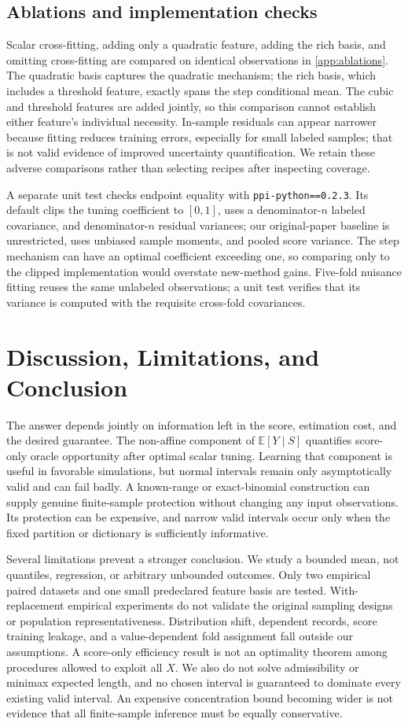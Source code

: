 \documentclass{article}
\newcommand{\E}{\mathbb{E}}
\begin{document}
\subsection{Ablations and implementation checks}
Scalar cross-fitting, adding only a quadratic feature, adding the rich basis, and omitting cross-fitting are compared on identical observations in \cref{app:ablations}. The quadratic basis captures the quadratic mechanism; the rich basis, which includes a threshold feature, exactly spans the step conditional mean. The cubic and threshold features are added jointly, so this comparison cannot establish either feature's individual necessity. In-sample residuals can appear narrower because fitting reduces training errors, especially for small labeled samples; that is not valid evidence of improved uncertainty quantification. We retain these adverse comparisons rather than selecting recipes after inspecting coverage.

A separate unit test checks endpoint equality with \texttt{ppi-python==0.2.3}. Its default clips the tuning coefficient to $[0,1]$, uses a denominator-$n$ labeled covariance, and denominator-$n$ residual variances; our original-paper baseline is unrestricted, uses unbiased sample moments, and pooled score variance. The step mechanism can have an optimal coefficient exceeding one, so comparing only to the clipped implementation would overstate new-method gains. Five-fold nuisance fitting reuses the same unlabeled observations; a unit test verifies that its variance is computed with the requisite cross-fold covariances.

\section{Discussion, Limitations, and Conclusion}
The answer depends jointly on information left in the score, estimation cost, and the desired guarantee. The non-affine component of $\E[Y\mid S]$ quantifies score-only oracle opportunity after optimal scalar tuning. Learning that component is useful in favorable simulations, but normal intervals remain only asymptotically valid and can fail badly. A known-range or exact-binomial construction can supply genuine finite-sample protection without changing any input observations. Its protection can be expensive, and narrow valid intervals occur only when the fixed partition or dictionary is sufficiently informative.

Several limitations prevent a stronger conclusion. We study a bounded mean, not quantiles, regression, or arbitrary unbounded outcomes. Only two empirical paired datasets and one small predeclared feature basis are tested. With-replacement empirical experiments do not validate the original sampling designs or population representativeness. Distribution shift, dependent records, score training leakage, and a value-dependent fold assignment fall outside our assumptions. A score-only efficiency result is not an optimality theorem among procedures allowed to exploit all $X$. We also do not solve admissibility or minimax expected length, and no chosen interval is guaranteed to dominate every existing valid interval. An expensive concentration bound becoming wider is not evidence that all finite-sample inference must be equally conservative.
\end{document}

